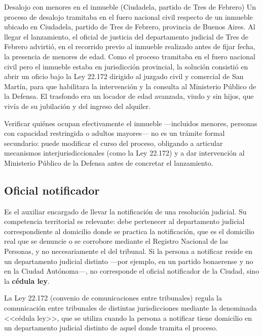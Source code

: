 \documentclass[12pt,oneside]{book}
\begin{document}
\begin{example}{Desalojo con menores en el inmueble (Ciudadela, partido de Tres de Febrero)}
Un proceso de desalojo tramitaba en el fuero nacional civil respecto de un inmueble ubicado en Ciudadela, partido de Tres de Febrero, provincia de Buenos Aires. Al llegar el lanzamiento, el oficial de justicia del departamento judicial de Tres de Febrero advirtió, en el recorrido previo al inmueble realizado antes de fijar fecha, la presencia de menores de edad. Como el proceso tramitaba en el fuero nacional civil pero el inmueble estaba en jurisdicción provincial, la solución consistió en abrir un oficio bajo la Ley 22.172 dirigido al juzgado civil y comercial de San Martín, para que habilitara la intervención y la consulta al Ministerio Público de la Defensa. El trasfondo era un locador de edad avanzada, viudo y sin hijos, que vivía de su jubilación y del ingreso del alquiler.
\end{example}

\begin{important}
Verificar quiénes ocupan efectivamente el inmueble ---incluidos menores, personas con capacidad restringida o adultos mayores--- no es un trámite formal secundario: puede modificar el curso del proceso, obligando a articular mecanismos interjurisdiccionales (como la Ley 22.172) y a dar intervención al Ministerio Público de la Defensa antes de concretar el lanzamiento.
\end{important}

\subsection{Oficial notificador}

Es el auxiliar encargado de llevar la notificación de una resolución judicial. Su competencia territorial es relevante: debe pertenecer al departamento judicial correspondiente al domicilio donde se practica la notificación, que es el domicilio real que se denuncie o se corrobore mediante el Registro Nacional de las Personas, y no necesariamente el del tribunal. Si la persona a notificar reside en un departamento judicial distinto ---por ejemplo, en un partido bonaerense y no en la Ciudad Autónoma---, no corresponde el oficial notificador de la Ciudad, sino la \textbf{cédula ley}.

\begin{important}
La Ley 22.172 (convenio de comunicaciones entre tribunales) regula la comunicación entre tribunales de distintas jurisdicciones mediante la denominada <<cédula ley>>, que se utiliza cuando la persona a notificar tiene domicilio en un departamento judicial distinto de aquel donde tramita el proceso.
\end{important}
\end{document}
